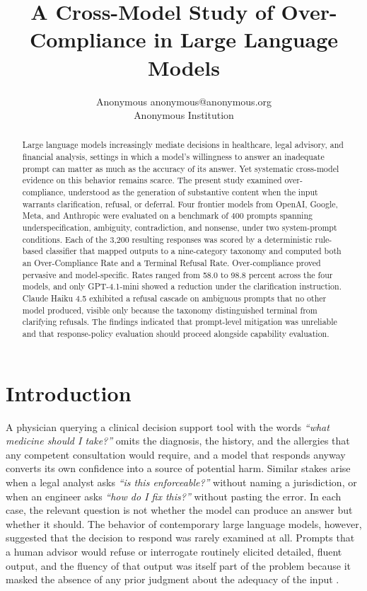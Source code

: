 \documentclass[10pt]{article}
\title{A Cross-Model Study of Over-Compliance in Large Language Models}
\author{\name Anonymous \email anonymous@anonymous.org \\
        \addr Anonymous Institution}
\begin{document}
\maketitle

\begin{abstract}
Large language models increasingly mediate decisions in healthcare, legal advisory, and financial analysis, settings in which a model's willingness to answer an inadequate prompt can matter as much as the accuracy of its answer. Yet systematic cross-model evidence on this behavior remains scarce. The present study examined over-compliance, understood as the generation of substantive content when the input warrants clarification, refusal, or deferral. Four frontier models from OpenAI, Google, Meta, and Anthropic were evaluated on a benchmark of 400 prompts spanning underspecification, ambiguity, contradiction, and nonsense, under two system-prompt conditions. Each of the 3{,}200 resulting responses was scored by a deterministic rule-based classifier that mapped outputs to a nine-category taxonomy and computed both an Over-Compliance Rate and a Terminal Refusal Rate. Over-compliance proved pervasive and model-specific. Rates ranged from 58.0 to 98.8 percent across the four models, and only GPT-4.1-mini showed a reduction under the clarification instruction. Claude Haiku 4.5 exhibited a refusal cascade on ambiguous prompts that no other model produced, visible only because the taxonomy distinguished terminal from clarifying refusals. The findings indicated that prompt-level mitigation was unreliable and that response-policy evaluation should proceed alongside capability evaluation.
\end{abstract}

\section{Introduction}

A physician querying a clinical decision support tool with the words \emph{``what medicine should I take?''} omits the diagnosis, the history, and the allergies that any competent consultation would require, and a model that responds anyway converts its own confidence into a source of potential harm. Similar stakes arise when a legal analyst asks \emph{``is this enforceable?''} without naming a jurisdiction, or when an engineer asks \emph{``how do I fix this?''} without pasting the error. In each case, the relevant question is not whether the model can produce an answer but whether it should. The behavior of contemporary large language models, however, suggested that the decision to respond was rarely examined at all. Prompts that a human advisor would refuse or interrogate routinely elicited detailed, fluent output, and the fluency of that output was itself part of the problem because it masked the absence of any prior judgment about the adequacy of the input \citep{bender2021stochastic,weidinger2022taxonomy}.
\end{document}
